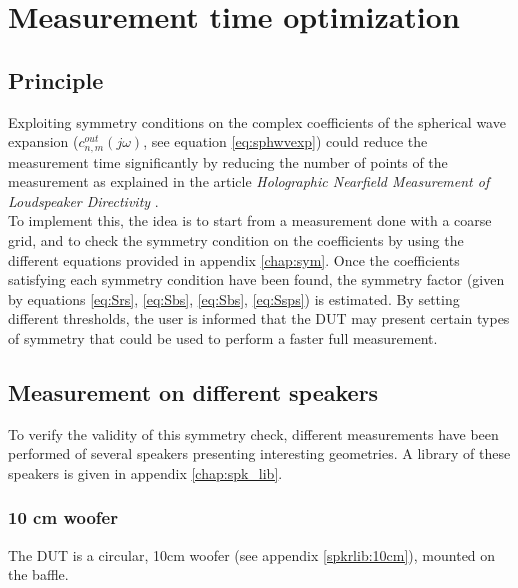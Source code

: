 \documentclass{report}
\begin{document}

\chapter{Measurement time optimization}

\section{Principle}

Exploiting symmetry conditions on the complex coefficients of the spherical wave expansion ($c_{n,m}^{out}(j \omega)$, see equation \ref{eq:sphwvexp}) could reduce the measurement time significantly by reducing the number of points of the measurement as explained in the article \textit{Holographic Nearfield Measurement of Loudspeaker Directivity} \citep[][sect.~4]{aeshs}. \\

To implement this, the idea is to start from a measurement done with a coarse grid, and to check the symmetry condition on the coefficients by using the different equations provided in appendix \ref{chap:sym}. Once the coefficients satisfying each symmetry condition have been found, the symmetry factor (given by equations \ref{eq:Srs}, \ref{eq:Sbs}, \ref{eq:Sbs}, \ref{eq:Ssps}) is estimated. By setting different thresholds, the user is informed that the DUT may present certain types of symmetry that could be used to perform a faster full measurement.

\section{Measurement on different speakers}

To verify the validity of this symmetry check, different measurements have been performed of several speakers presenting interesting geometries. A library of these speakers is given in appendix \ref{chap:spk_lib}. 

\subsection{10 cm woofer}

The DUT is a circular, 10cm woofer (see appendix \ref{spkrlib:10cm}), mounted on the baffle. \\
\end{document}
